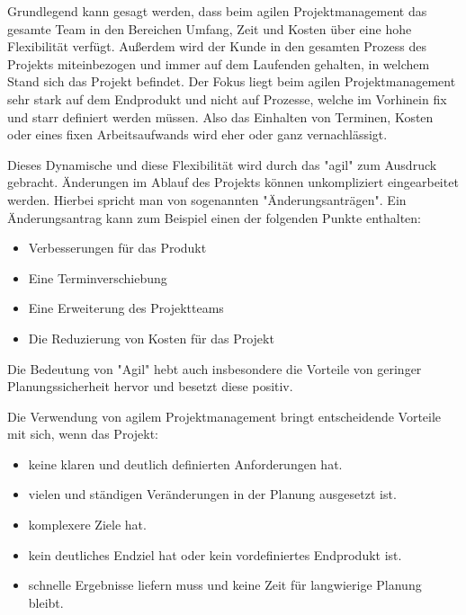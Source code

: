

Grundlegend kann gesagt werden, dass beim agilen Projektmanagement das gesamte Team in den Bereichen Umfang, Zeit und Kosten über eine hohe Flexibilität verfügt. Außerdem wird der Kunde in den gesamten Prozess des Projekts miteinbezogen und immer auf dem Laufenden gehalten, in welchem Stand sich das Projekt befindet. Der Fokus liegt beim agilen Projektmanagement sehr stark auf dem Endprodukt und nicht auf Prozesse, welche im Vorhinein fix und starr definiert werden müssen. Also das Einhalten von Terminen, Kosten oder eines fixen Arbeitsaufwands wird eher oder ganz vernachlässigt. \cite{agil}

Dieses Dynamische und diese Flexibilität wird durch das "agil" zum Ausdruck gebracht. Änderungen im Ablauf des Projekts können unkompliziert eingearbeitet werden. Hierbei spricht man von sogenannten "Änderungsanträgen". Ein Änderungsantrag kann zum Beispiel einen der folgenden Punkte enthalten: \cite{agil}

\begin{itemize}
    \item Verbesserungen für das Produkt
    \item Eine Terminverschiebung
    \item Eine Erweiterung des Projektteams
    \item Die Reduzierung von Kosten für das Projekt
\end{itemize}

\cite{Aenderung}

Die Bedeutung von "Agil" hebt auch insbesondere die Vorteile von geringer Planungssicherheit hervor und besetzt diese positiv. \cite{agil} 


Die Verwendung von agilem Projektmanagement bringt entscheidende Vorteile mit sich, wenn das Projekt:

\begin{itemize}
    \item keine klaren und deutlich definierten Anforderungen hat.
    \item vielen und ständigen Veränderungen in der Planung ausgesetzt ist.
    \item komplexere Ziele hat.
    \item kein deutliches Endziel hat oder kein vordefiniertes Endprodukt ist.
    \item schnelle Ergebnisse liefern muss und keine Zeit für langwierige Planung bleibt.
\end{itemize}

